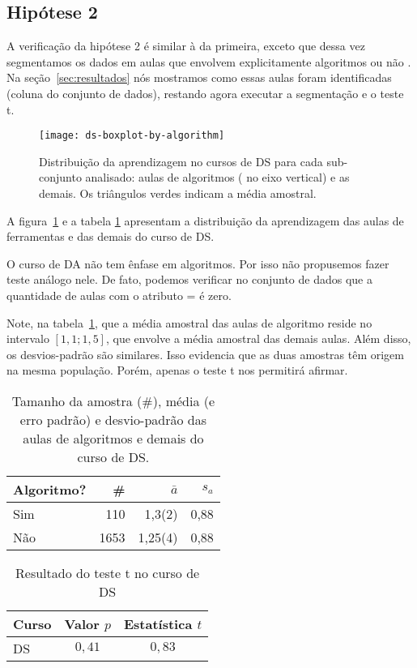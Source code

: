 \subsection{Hipótese 2}

A verificação da hipótese 2 é similar à da primeira, exceto que dessa vez segmentamos os dados em aulas que envolvem explicitamente algoritmos ou não
.
Na seção~\ref{sec:resultados} nós mostramos como essas aulas foram identificadas (coluna  do conjunto de dados), restando agora executar a segmentação e o teste t.

\begin{figure}
	\centering
	\texttt{[image: ds-boxplot-by-algorithm]}
	\caption{Distribuição da aprendizagem no cursos de DS para cada sub-conjunto analisado: aulas de algoritmos ( no eixo vertical) e as demais. Os triângulos verdes indicam a média amostral.}
	\label{fig:dist-hipotese-2}
\end{figure}

A figura~\ref{fig:dist-hipotese-2} e a tabela \ref{tab:dist-hipotese-2} apresentam a distribuição da aprendizagem das aulas de ferramentas e das demais do curso de DS.

O curso de DA não tem ênfase em algoritmos.
Por isso não propusemos fazer teste análogo nele.
De fato, podemos verificar no conjunto de dados que a quantidade de aulas com o atributo  =  é zero.

Note, na tabela~\ref{tab:dist-hipotese-2}, que a média amostral das aulas de algoritmo reside no intervalo $[1,1; 1,5]$, que envolve a média amostral das demais aulas.
Além disso, os desvios-padrão são similares.
Isso evidencia que as duas amostras têm origem na mesma população.
Porém, apenas o teste t nos permitirá afirmar.

\begin{table}
	\centering
	\caption{Tamanho da amostra (\#), média (e erro padrão) e desvio-padrão das aulas de algoritmos e demais do curso de DS.}
	\label{tab:dist-hipotese-2}
	\begin{tabular}{lrrr}
		\toprule
		Algoritmo? & \# & $\bar{a}$ & $s_a$ \\
		\midrule
		Sim &  110 &  1,3(2) & 0,88 \\
		Não & 1653 & 1,25(4) & 0,88 \\
		\bottomrule
	\end{tabular}
\end{table}

\begin{table}
	\centering
	\caption{Resultado do teste t no curso de DS}
	\begin{tabular}{lcc}
	\toprule
	Curso & Valor $p$   & Estatística $t$ \\
	\midrule
	DS    & $0,41$      & $0,83$ \\ 
	\bottomrule
	\end{tabular}
\end{table}

